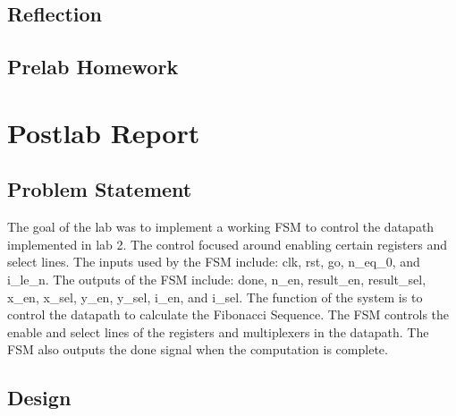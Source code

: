 \documentclass{article}
\begin{document}
\subsection*{Reflection} %

\subsection*{Prelab Homework}

\section*{Postlab Report}

\subsection*{Problem Statement}
The goal of the lab was to implement a working FSM to control the datapath implemented in lab 2. The control focused around enabling certain registers and select lines. The inputs used by the FSM include: clk, rst, go, n\_eq\_0, and i\_le\_n. The outputs of the FSM include: done, n\_en, result\_en, result\_sel, x\_en, x\_sel, y\_en, y\_sel, i\_en, and i\_sel. The function of the system is to control the datapath to calculate the Fibonacci Sequence. The FSM controls the enable and select lines of the registers and multiplexers in the datapath. The FSM also outputs the done signal when the computation is complete.

\subsection*{Design}
\end{document}
